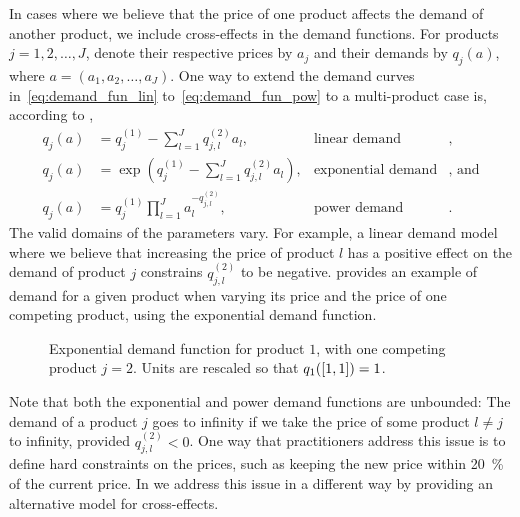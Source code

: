 \documentclass[main.tex]{subfiles}
\begin{document}
In cases where we believe that the price of one product affects the
demand of another product, we include cross-effects in the demand
functions. For products $j=1,2,\dots,J$, denote their respective prices by
$a_j$ and their demands by $q_j(a)$, where $a=(a_1,a_2,\dots,a_J)$.
One way to extend the demand curves in~\eqref{eq:demand_fun_lin}
to~\eqref{eq:demand_fun_pow} to a multi-product case is, according to \citet{talluri2006theory},
\begin{align}
  q_j(a)&=q_{j}^{(1)}-\sum_{l=1}^Jq_{j,l}^{(2)}a_l,
  &\text{linear demand}&,\\
  q_j(a)&=\exp\left( q_{j}^{(1)}-\sum_{l=1}^Jq_{j,l}^{(2)}a_l
          \right),
  &\text{exponential demand}&\text{, and}\\
  q_j(a)&=q_j^{(1)}\prod_{l=1}^Ja_l^{-q_{j,l}^{(2)}},
  &\text{power demand}&.
\end{align}
The valid domains of the parameters vary. For example, a linear demand
model where we believe that increasing the price of product $l$ has a
positive effect on the demand of product $j$ constrains
$q_{j,l}^{(2)}$ to be negative. 
provides an example of demand for a given product when varying
its price and the price of one competing product, using the exponential demand function.
\begin{figure}[htbp]
  \centering
  \caption[Exponential demand function]{Exponential demand function for product $1$, with one
    competing product $j=2$.
    Units are rescaled so that $q_1(\left[1,1\right])=1$.
  }\label{fig:demand_exponential_two}
\end{figure}

\begin{remark}
  Note that both the exponential
  and power demand functions are unbounded: The demand of a product
  $j$ goes to infinity if we take the price of some product $l\neq j$
  to infinity, provided $q_{j,l}^{(2)}<0$. One way that practitioners
  address this issue is to define hard constraints on the prices, such as
  keeping the new price within \SI{20}{\percent} of the current price.
  In  we address this issue in a different way by
  providing an alternative model for cross-effects.
\end{remark}
\end{document}
